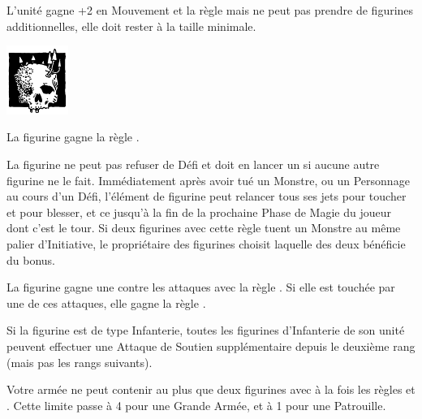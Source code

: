 \begin{multicols}{2}
L'unité gagne +2 en Mouvement et la règle \skirmisher{} mais ne peut pas prendre de figurines additionnelles, elle doit rester à la taille minimale.

\vspace*{0.2cm}\vspace*{\fill}

\begin{center}\includegraphics[width=2cm]{pics/pestilence.png}

\noindent\textbf{\chosenofpestilence}
\end{center}

La figurine gagne la règle \fear{}.

\end{multicols}

\armyspecialruleentry{\gazeofthegods}

La figurine ne peut pas refuser de Défi et doit en lancer un si aucune autre figurine ne le fait. Immédiatement après avoir tué un Monstre, ou un Personnage au cours d'un Défi, l'élément de figurine peut relancer tous ses jets pour toucher et pour blesser, et ce jusqu'à la fin de la prochaine Phase de Magie du joueur dont c'est le tour. Si deux figurines avec cette règle tuent un Monstre au même palier d'Initiative,  le propriétaire des figurines choisit laquelle des deux bénéficie du bonus.

\armyspecialruleentry{\lightningrage}

La figurine gagne une  contre les attaques avec la règle \lightningattacks{}. Si elle est touchée par une de ces attaques, elle gagne la règle \frenzy{}.

\armyspecialruleentry{\inspiregreatness}

Si la figurine est de type Infanterie, toutes les figurines d'Infanterie de son unité peuvent effectuer une Attaque de Soutien supplémentaire depuis le deuxième rang (mais pas les rangs suivants).

\armyspecialruleentry{\survivalofthefittest}

Votre armée ne peut contenir au plus que deux figurines avec à la fois les règles \largetarget{} et \fly{}. Cette limite passe à 4 pour une Grande Armée, et à 1 pour une Patrouille.

\closearmyspecialrules







